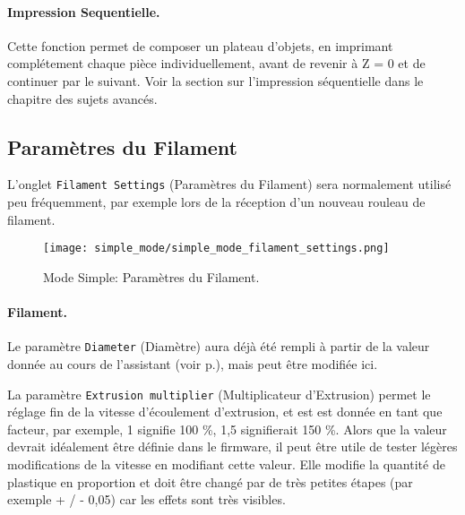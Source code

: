 
\paragraph{Impression Sequentielle.} %
\label{par:sequential_printing}
Cette fonction permet de composer un plateau d'objets, en imprimant compl\'etement chaque pi\`ece individuellement, avant de revenir \`a Z = 0 et de continuer par le suivant. Voir la section sur l'impression s\'equentielle dans le chapitre des sujets avanc\'es.


\subsection{Param\`etres du Filament}
L'onglet \texttt{Filament Settings} (Param\`etres du Filament) sera normalement utilis\'e peu fr\'equemment, par exemple lors de la r\'eception d'un nouveau rouleau de filament.

\begin{figure}[H]
\centering
\texttt{[image: simple\_mode/simple\_mode\_filament\_settings.png]}
\caption{Mode Simple: Param\`etres du Filament.}
\label{fig:simple_mode_filament_settings}
\end{figure}

\paragraph{Filament.} %
\label{par:filament}
Le param\`etre \texttt{Diameter} (Diam\`etre) aura d\'ej\`a \'et\'e rempli \`a partir de la valeur donn\'ee au cours de l'assistant (voir p.\pageref{sub:4_filament_diameter}), mais peut \^etre modifi\'ee ici.

La param\`etre \texttt{Extrusion multiplier} (Multiplicateur d'Extrusion) permet le r\'eglage fin de la vitesse d'\'ecoulement d'extrusion, et est est donn\'ee en tant que facteur, par exemple, 1 signifie 100 \%, 1,5 signifierait 150 \%. Alors que la valeur devrait id\'ealement \^etre d\'efinie dans le firmware, il peut \^etre utile de tester l\'eg\`eres modifications de la vitesse en modifiant cette valeur. Elle modifie la quantit\'e de plastique en proportion et doit \^etre chang\'e par de tr\`es petites \'etapes (par exemple + / - 0,05) car les effets sont tr\`es visibles.

